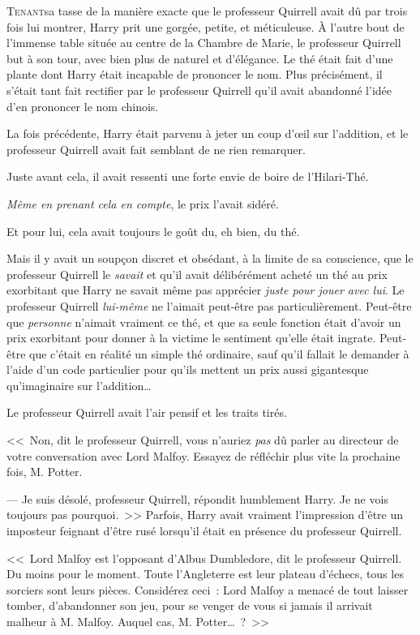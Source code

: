 
\lettrine{T}{enant}sa tasse de la manière exacte que le professeur Quirrell avait dû par trois fois lui montrer, Harry prit une gorgée, petite, et méticuleuse. À l'autre bout de l'immense table située au centre de la Chambre de Marie, le professeur Quirrell but à son tour, avec bien plus de naturel et d'élégance. Le thé était fait d'une plante dont Harry était incapable de prononcer le nom. Plus précisément, il s'était tant fait rectifier par le professeur Quirrell qu'il avait abandonné l'idée d'en prononcer le nom chinois.

La fois précédente, Harry était parvenu à jeter un coup d'œil sur l'addition, et le professeur Quirrell avait fait semblant de ne rien remarquer.

Juste avant cela, il avait ressenti une forte envie de boire de l'Hilari-Thé.

\emph{Même en prenant cela en compte}, le prix l'avait sidéré.

Et pour lui, cela avait toujours le goût du, eh bien, du thé.

Mais il y avait un soupçon discret et obsédant, à la limite de sa conscience, que le professeur Quirrell le \emph{savait} et qu'il avait délibérément acheté un thé au prix exorbitant que Harry ne savait même pas apprécier \emph{juste pour jouer avec lui}. Le professeur Quirrell \emph{lui-même} ne l'aimait peut-être pas particulièrement. Peut-être que \emph{personne} n'aimait vraiment ce thé, et que sa seule fonction était d'avoir un prix exorbitant pour donner à la victime le sentiment qu'elle était ingrate. Peut-être que c'était en réalité un simple thé ordinaire, sauf qu'il fallait le demander à l'aide d'un code particulier pour qu'ils mettent un prix aussi gigantesque qu'imaginaire sur l'addition…

Le professeur Quirrell avait l'air pensif et les traits tirés.

<<~Non, dit le professeur Quirrell, vous n'auriez \emph{pas} dû parler au directeur de votre conversation avec Lord Malfoy. Essayez de réfléchir plus vite la prochaine fois, M. Potter.

--- Je suis désolé, professeur Quirrell, répondit humblement Harry. Je ne vois toujours pas pourquoi.~>> Parfois, Harry avait vraiment l'impression d'être un imposteur feignant d'être rusé lorsqu'il était en présence du professeur Quirrell.

<<~Lord Malfoy est l'opposant d'Albus Dumbledore, dit le professeur Quirrell. Du moins pour le moment. Toute l'Angleterre est leur plateau d'échecs, tous les sorciers sont leurs pièces. Considérez ceci~: Lord Malfoy a menacé de tout laisser tomber, d'abandonner son jeu, pour se venger de vous si jamais il arrivait malheur à M. Malfoy. Auquel cas, M. Potter…~?~>>

